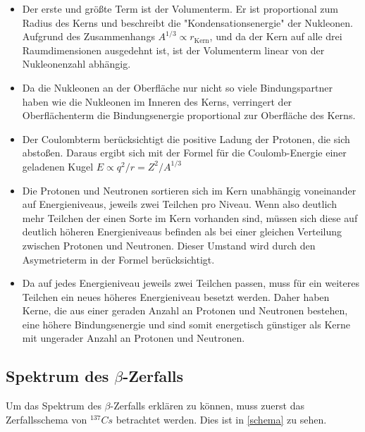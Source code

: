 \begin{itemize}
\item Der erste und größte Term ist der Volumenterm. Er ist proportional zum Radius des Kerns und beschreibt die "Kondensationsenergie" der Nukleonen. Aufgrund des Zusammenhangs $A^{1/3} \propto r_\text{Kern}$, und da der Kern auf alle drei Raumdimensionen ausgedehnt ist, ist der Volumenterm linear von der Nukleonenzahl abhängig.

\item Da die Nukleonen an der Oberfläche nur nicht so viele Bindungspartner haben wie die Nukleonen im Inneren des Kerns, verringert der Oberflächenterm die Bindungsenergie proportional zur Oberfläche des Kerns.

\item Der Coulombterm berücksichtigt die positive Ladung der Protonen, die sich abstoßen. Daraus ergibt sich mit der Formel für die Coulomb-Energie einer geladenen Kugel $E \propto q^2/r = Z^2/A^{1/3}$

\item Die Protonen und Neutronen sortieren sich im Kern unabhängig voneinander auf Energieniveaus, jeweils zwei Teilchen pro Niveau. Wenn also deutlich mehr Teilchen der einen Sorte im Kern vorhanden sind, müssen sich diese auf deutlich höheren Energieniveaus befinden als bei einer gleichen Verteilung zwischen Protonen und Neutronen. Dieser Umstand wird durch den Asymetrieterm in der Formel berücksichtigt.

\item Da auf jedes Energieniveau jeweils zwei Teilchen passen, muss für ein weiteres Teilchen ein neues höheres Energieniveau besetzt werden. Daher haben Kerne, die aus einer geraden Anzahl an Protonen und Neutronen bestehen, eine höhere Bindungsenergie und sind somit energetisch günstiger als Kerne mit ungerader Anzahl an Protonen und Neutronen.
\end{itemize}

\subsection{Spektrum des $\beta$-Zerfalls}
Um das Spektrum des $\beta$-Zerfalls erklären zu können, muss zuerst das Zerfallsschema von $^{137}Cs$ betrachtet werden. Dies ist in \cref{schema} zu sehen.

